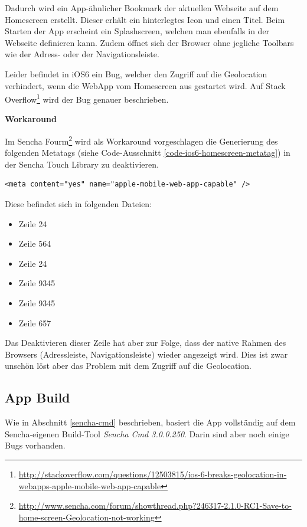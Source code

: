 Dadurch wird ein App-ähnlicher Bookmark der aktuellen Webseite auf dem Homescreen erstellt.
Dieser erhält ein hinterlegtes Icon und einen Titel.
Beim Starten der App erscheint ein Splashscreen, welchen man ebenfalls in der Webseite definieren kann.
Zudem öffnet sich der Browser ohne jegliche Toolbars wie der Adress- oder der Navigationsleiste.

Leider befindet in iOS6 ein Bug, welcher den Zugriff auf die Geolocation verhindert, wenn die \gls{WebApp} vom Homescreen aus gestartet wird.
Auf Stack Overflow\footnote{\url{http://stackoverflow.com/questions/12503815/ios-6-breaks-geolocation-in-webapps-apple-mobile-web-app-capable}} wird der Bug genauer beschrieben.

\textbf{Workaround}

Im Sencha Fourm\footnote{\url{http://www.sencha.com/forum/showthread.php?246317-2.1.0-RC1-Save-to-home-screen-Geolocation-not-working}} wird als Workaround vorgeschlagen die Generierung des folgenden Metatags (siehe Code-Ausschnitt \ref{code-ios6-homescreen-metatag}) in der Sencha Touch Library zu deaktivieren.

\lstset{language=HTML}
\begin{lstlisting}[caption=Metatag für iOS6 Workaround, label=code-ios6-homescreen-metatag]
<meta content="yes" name="apple-mobile-web-app-capable" />
\end{lstlisting}

Diese befindet sich in folgenden Dateien:

\begin{itemize}
\item {} Zeile 24
\item {} Zeile 564
\item {} Zeile 24
\item {} Zeile 9345
\item {} Zeile 9345
\item {} Zeile 657
\end{itemize}

Das Deaktivieren dieser Zeile hat aber zur Folge, dass der native Rahmen des Browsers (Adressleiste, Navigationsleiste) wieder angezeigt wird.
Dies ist zwar unschön löst aber das Problem mit dem Zugriff auf die Geolocation.

\subsection{App Build}
Wie in Abschnitt \ref{sencha-cmd} beschrieben, basiert die App vollständig auf dem Sencha-eigenen Build-Tool \emph{Sencha Cmd 3.0.0.250}. Darin sind aber noch einige Bugs vorhanden.

